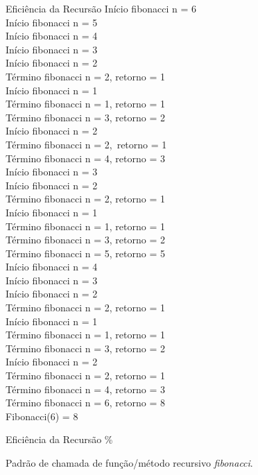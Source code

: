 \begin{frame}[fragile]{Eficiência da Recursão}
\tiny{
Início fibonacci n = 6\\
Início fibonacci n = 5\\
Início fibonacci n = 4\\
Início fibonacci n = 3\\
Início fibonacci n = 2\\
Término fibonacci n = 2, retorno = 1\\
Início fibonacci n = 1\\
Término fibonacci n = 1, retorno = 1\\
Término fibonacci n = 3, retorno = 2\\
Início fibonacci n = 2\\
Término fibonacci n = 2,\ retorno = 1\\
Término fibonacci n = 4, retorno = 3\\
Início fibonacci n = 3\\
Início fibonacci n = 2\\
Término fibonacci n = 2, retorno = 1\\
Início fibonacci n = 1\\
Término fibonacci n = 1, retorno = 1\\
Término fibonacci n = 3, retorno = 2\\
Término fibonacci n = 5, retorno = 5\\
Início fibonacci n = 4\\
Início fibonacci n = 3\\
Início fibonacci n = 2\\
Término fibonacci n = 2, retorno = 1\\
Início fibonacci n = 1\\
Término fibonacci n = 1, retorno = 1\\
Término fibonacci n = 3, retorno = 2\\
Início fibonacci n = 2\\
Término fibonacci n = 2, retorno = 1\\
Término fibonacci n = 4, retorno = 3\\
Término fibonacci n = 6, retorno = 8\\
Fibonacci(6) = 8\\
}
\end{frame}


\begin{frame}{Eficiência da Recursão}
\%%

\begin{center} Padrão de chamada de função/método recursivo \textit{fibonacci}. \end{center}
\end{frame}

